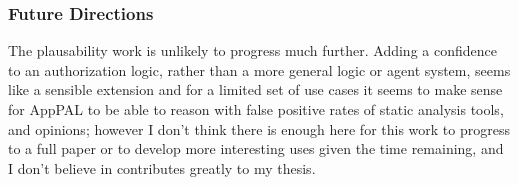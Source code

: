\documentclass[a4paper]{scrartcl}
\newcommand{\new}[1]{{\color{BrickRed}#1}}
\begin{document}






\subsubsection*{Future Directions}

The plausability work is unlikely to progress much
further.  Adding a confidence to an authorization logic, rather than a more
general logic or agent system, seems like a sensible extension and for a limited
set of use cases it seems to make sense for AppPAL to be able to reason with false
positive rates of static analysis tools, and opinions; however I don't think
there is enough here for this work to progress to a full paper or to develop
more interesting uses given the time remaining, and I don't believe in
contributes greatly to my thesis.
\end{document}
